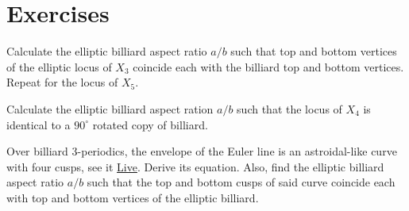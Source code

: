 \section{Exercises}

\begin{exercise}
Calculate the elliptic billiard aspect ratio $a/b$ such that top and bottom vertices of the elliptic locus of $X_3$ coincide each with the billiard top and bottom vertices. Repeat for the locus of $X_5$.
\end{exercise}

\begin{exercise}
Calculate the elliptic billiard aspect ration $a/b$ such that the locus of $X_4$ is identical to a $90^\circ$ rotated copy of billiard.
\end{exercise}

\begin{exercise}
Over billiard 3-periodics, the envelope of the Euler line is an astroidal-like curve with four cusps, see it \href{https://bit.ly/3yiCvrn}{Live}. Derive its equation. Also, find the elliptic billiard aspect ratio $a/b$ such that the top and bottom cusps of said curve coincide each with top and bottom vertices of the elliptic billiard.
\end{exercise}